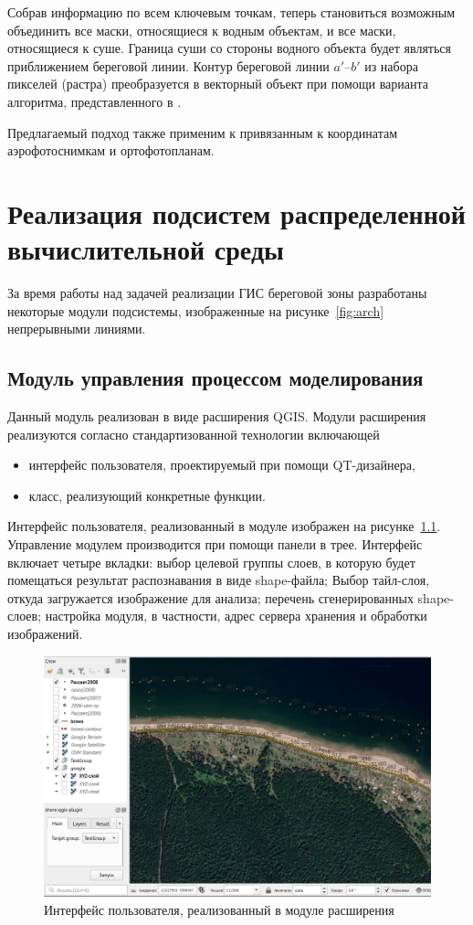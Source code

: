 \documentclass[732,14pt,final]{studrep}
\begin{document}
Собрав информацию по всем ключевым точкам, теперь становиться возможным объединить все маски, относящиеся к водным объектам, и все маски, относящиеся к суше. Граница суши со стороны водного объекта будет являться приближением береговой линии. Контур береговой линии $a'$--$b'$ из набора пикселей (растра) преобразуется в векторный объект при помощи варианта алгоритма, представленного в \cite{b3}.

Предлагаемый подход также применим к привязанным к координатам аэрофотоснимкам и ортофотопланам.

\chapter{Реализация подсистем распределенной вычислительной среды}\label{chap:impl}

За время работы над задачей реализации ГИС береговой зоны разработаны некоторые модули подсистемы, изображенные на рисунке~\ref{fig:arch} непрерывными линиями.

\section{Модуль управления процессом моделирования}

Данный модуль реализован в виде расширения QGIS. Модули расширения реализуются согласно стандартизованной технологии включающей
\begin{itemize}
\item интерфейс пользователя, проектируемый при помощи QT-дизайнера,
\item класс, реализующий конкретные функции.
\end{itemize}

Интерфейс пользователя, реализованный в модуле изображен на рисунке~\ref{fig:plugin-ui}. Управление модулем производится при помощи панели в трее. Интерфейс включает четыре вкладки: выбор целевой группы слоев, в которую будет помещаться результат распознавания в виде shape-файла; Выбор тайл-слоя, откуда загружается изображение для анализа; перечень сгенерированных shape-слоев; настройка модуля, в частности, адрес сервера хранения и обработки изображений.
  \begin{figure}[htp]
    \centering
    \includegraphics[width=\linewidth]{pics/plugin-ui.png}
    \caption{Интерфейс пользователя, реализованный в модуле расширения}
    \label{fig:plugin-ui}
  \end{figure}
\end{document}
